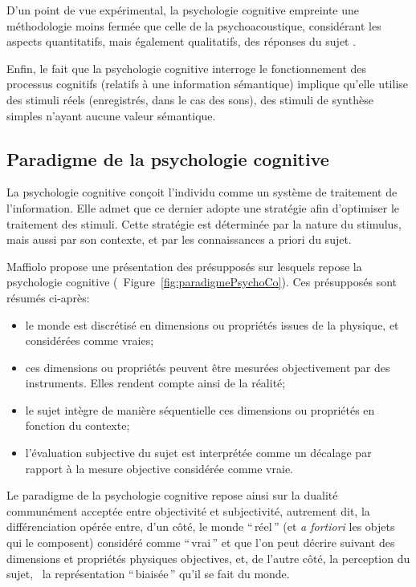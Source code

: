 D'un point de vue expérimental, la psychologie cognitive empreinte une méthodologie moins fermée que celle de la psychoacoustique, considérant les aspects quantitatifs, mais également qualitatifs, des réponses du sujet \citep{maffiolo_marieParis_1997,maffiolo_caracterisation_1999}. 

Enfin, le fait que la psychologie cognitive interroge le fonctionnement des processus cognitifs (relatifs à une information sémantique) implique qu'elle utilise des stimuli réels (enregistrés, dans le cas des sons), des stimuli de synthèse simples n'ayant aucune valeur sémantique.

\subsection{Paradigme de la psychologie cognitive}
\label{sec:ch3_psychoCog}

La psychologie cognitive conçoit l'individu comme un système de traitement de l'information. Elle admet que ce dernier adopte une stratégie afin d'optimiser le traitement des stimuli. Cette stratégie est déterminée par la nature du stimulus, mais aussi par son contexte, et par les connaissances a priori du sujet.

Maffiolo \citep{maffiolo_caracterisation_1999} propose une présentation des présupposés sur lesquels repose la psychologie cognitive (\cf~Figure~\ref{fig:paradigmePsychoCo}). Ces présupposés sont résumés ci-après:

\begin{itemize}
\item le monde est discrétisé en dimensions ou propriétés issues de la physique, et considérées comme vraies;
\item ces dimensions ou propriétés peuvent être mesurées objectivement par des instruments. Elles rendent compte ainsi de la réalité;
\item le sujet intègre de manière séquentielle ces dimensions ou propriétés en fonction du contexte;
\item l'évaluation subjective du sujet est interprétée comme un décalage par rapport à la mesure objective considérée comme vraie.
\end{itemize}

Le paradigme de la psychologie cognitive repose ainsi sur la dualité communément acceptée entre objectivité et subjectivité, autrement dit, la différenciation opérée entre, d'un côté, le monde ``\,réel\,'' (et \emph{a fortiori} les objets qui le composent) considéré comme ``\,vrai\,'' et que l'on peut décrire suivant des dimensions et propriétés physiques objectives, et, de l'autre côté, la perception du sujet, \ie~la représentation ``\,biaisée\,'' qu'il se fait du monde.

